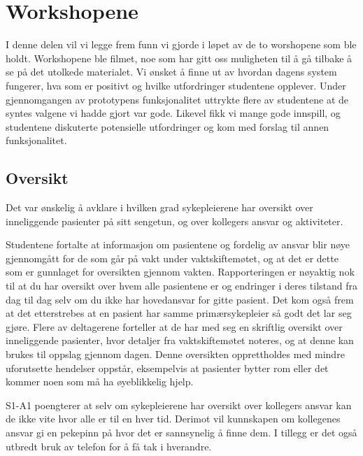 \section{Workshopene}
\label{ws}
I denne delen vil vi legge frem funn vi gjorde i løpet av de to worshopene som ble holdt. Workshopene ble filmet, noe som har gitt oss muligheten til å gå tilbake å se på det utolkede materialet. Vi ønsket å finne ut av hvordan dagens system fungerer, hva som er positivt og hvilke utfordringer studentene opplever. Under gjennomgangen av prototypens funksjonalitet uttrykte flere av studentene at de syntes valgene vi hadde gjort var gode. Likevel fikk vi mange gode innspill, og studentene diskuterte potensielle utfordringer og kom med forslag til annen funksjonalitet. 


\subsection{Oversikt}
Det var ønskelig å avklare i hvilken grad sykepleierene har oversikt over inneliggende pasienter på sitt sengetun, og over kollegers ansvar og aktiviteter.

\noindent
Studentene fortalte at informasjon om pasientene og fordelig av ansvar blir nøye gjennomgått for de som går på vakt under vaktskiftemøtet, og at det er dette som er gunnlaget for oversikten gjennom vakten. Rapporteringen er nøyaktig nok til at du har oversikt over hvem alle pasientene er og endringer i deres tilstand fra dag til dag selv om du ikke har hovedansvar for gitte pasient. Det kom også frem at det etterstrebes at en pasient har samme primærsykepleier så godt det lar seg gjøre. Flere av deltagerene forteller at de har med seg en skriftlig oversikt over inneliggende pasienter, hvor detaljer fra vaktskiftemøtet noteres, og at denne kan brukes til oppslag gjennom dagen. Denne oversikten opprettholdes med mindre uforutsette hendelser oppstår, eksempelvis at pasienter bytter rom eller det kommer noen som må ha øyeblikkelig hjelp. 

\noindent
S1-A1 poengterer at selv om sykepleierene har oversikt over kollegers ansvar kan de ikke vite hvor alle er til en hver tid. Derimot vil kunnskapen om kollegenes ansvar gi en pekepinn på hvor det er sannsynelig å finne dem. I tillegg er det også utbredt bruk av telefon for å få tak i hverandre. 

